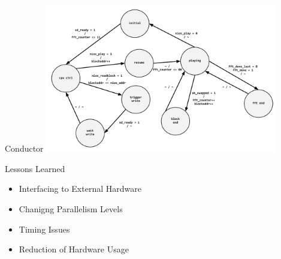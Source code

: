 \documentclass{beamer}
\begin{document}
\begin{frame}{Conductor}
	\centering
    \includegraphics[width=4in]{conductor_state}
\end{frame}

\begin{frame}{Lessons Learned}
	\begin{itemize}
		\item Interfacing to External Hardware
		\item Chanigng Parallelism Levels
		\item Timing Issues
		\item Reduction of Hardware Usage
	\end{itemize}
\end{frame}
\end{document}
